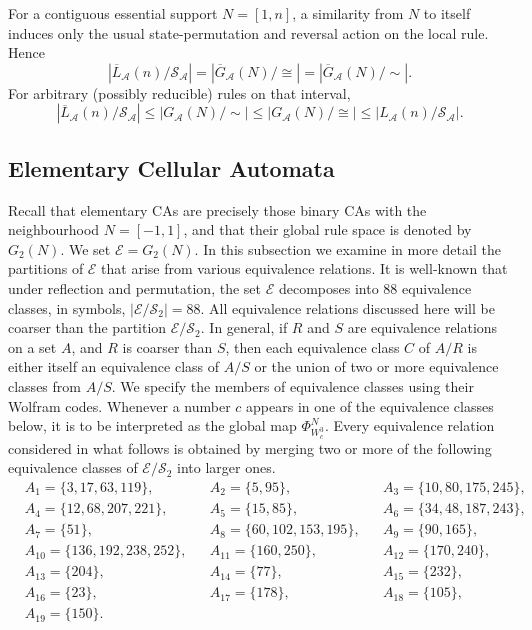 \documentclass[11pt,a4paper]{article}
\newcommand{\rev}[1]{{\color{blue}#1}}
\newenvironment{revision}{\color{blue}}{}
\newcommand{\rev}[1]{{\color{black}#1}}
\newenvironment{revision}{\color{black}}{}
\begin{document}
\begin{revision}
For a contiguous essential support $N=[1,n]$, a similarity from $N$ to
itself induces only the usual state-permutation and reversal action on
the local rule. Hence
\[
|\overline L_{\mathcal A}(n)/\mathcal S_{\mathcal A}|
=|\overline G_{\mathcal A}(N)/{\cong}|
=|\overline G_{\mathcal A}(N)/{\sim}|.
\]
For arbitrary (possibly reducible) rules on that interval,
\[
|\overline L_{\mathcal A}(n)/\mathcal S_{\mathcal A}|
\leq|G_{\mathcal A}(N)/{\sim}|
\leq|G_{\mathcal A}(N)/{\cong}|
\leq|L_{\mathcal A}(n)/\mathcal S_{\mathcal A}|.
\]
\end{revision}

\subsection{Elementary Cellular Automata}
Recall that elementary CAs are precisely those binary CAs with the neighbourhood $N = [-1,1]$,
and that their global rule space is denoted by $G_2(N)$.
We set $\mathcal{E} = G_2(N)$.
In this subsection we examine in more detail the partitions of $\mathcal{E}$ that arise from various equivalence relations.
It is well-known that under reflection and permutation,  \rev{the set $\mathcal{E}$ decomposes} into 88 equivalence classes,
in symbols, $|\mathcal{E} / \mathcal{S}_2| = 88$.
All equivalence relations discussed here will be coarser than the partition $\mathcal{E} / \mathcal{S}_2$.
In general, if $R$ and $S$ are equivalence relations on a set $A$, and $R$ is coarser than $S$,
then each equivalence class $C$ of $A / R$ is either itself an equivalence class of $A / S$ or the union of
two or more equivalence classes from $A / S$.
We specify the members of equivalence classes using their Wolfram codes.
Whenever a number $c$ appears in one of the equivalence classes below, it is to be interpreted as the global map $\Phi^{N}_{W^3_c}$.
Every equivalence relation considered in what follows is obtained by merging two or more of the following equivalence classes of
$\mathcal{E} / \mathcal{S}_2$ into larger ones.
\begin{align*}
& A_1 = \{3,17,63,119\}, & & A_2=\{5,95\}, & & A_3 = \{10,80,175,245\}, \\
& A_4 = \{12,68,207,221\}, & & A_5=\{15,85\}, & & A_6=\{34,48,187,243\}, \\
& A_7 = \{51\}, & & A_8=\{60,102,153,195\}, & & A_9 = \{90, 165\}, \\
& A_{10} = \{136, 192, 238, 252\}, & & A_{11}=\{160,250\}, & & A_{12}=\{170,240\}, \\
& A_{13}=\{204\}, & &  A_{14} = \{77\},  & & A_{15} = \{232 \}, \\
& A_{16} = \{ 23 \}, & & A_{17} = \{178\}, & & A_{18}=\{105\}, \\
& A_{19} = \{150\}. & & & &
\end{align*}
\end{document}
